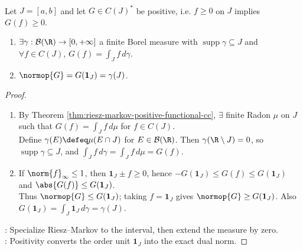 \begin{corollary} \label{cor:positive-riesz-representation-c-interval} \\
Let $J=[a,b]$ and let $G\in C(J)^*$ be positive, i.e. $f\geq0$ on $J$ implies $G(f)\geq0$.
\begin{enumerate}[label=(\roman*)]
\setlength{\itemsep}{0pt}
\item $\exists\gamma:\mathcal{B}(\R)\to[0,+\infty]$ a finite Borel measure with $\operatorname{supp}\gamma\subseteq J$ and $\forall f\in C(J)$, $G(f)=\int_J f\,d\gamma$.
\item $\normop{G}=G(\mathbf{1}_J)=\gamma(J)$.
\end{enumerate}
\begin{proof}
\begin{enumerate}[label=(\roman*)]
\setlength{\itemsep}{0pt}
\item By Theorem \ref{thm:riesz-markov-positive-functional-cc}, $\exists$ finite Radon $\mu$ on $J$ such that $G(f)=\int_J f\,d\mu$ for $f\in C(J)$.\\
Define $\gamma(E)\defeq\mu(E\cap J)$ for $E\in\mathcal B(\R)$. Then $\gamma(\R\setminus J)=0$, so $\operatorname{supp}\gamma\subseteq J$, and $\int_J f\,d\gamma=\int_J f\,d\mu=G(f)$.
\item If $\norm{f}_\infty\leq1$, then $\mathbf{1}_J\pm f\geq0$, hence $-G(\mathbf{1}_J)\leq G(f)\leq G(\mathbf{1}_J)$ and $\abs{G(f)}\leq G(\mathbf{1}_J)$.\\
Thus $\normop{G}\leq G(\mathbf{1}_J)$; taking $f=\mathbf{1}_J$ gives $\normop{G}\geq G(\mathbf{1}_J)$. Also $G(\mathbf{1}_J)=\int_J\mathbf{1}_J\,d\gamma=\gamma(J)$.
\end{enumerate}
: Specialize Riesz--Markov to the interval, then extend the measure by zero.\\
: Positivity converts the order unit $\mathbf{1}_J$ into the exact dual norm.
\end{proof}
\end{corollary}

